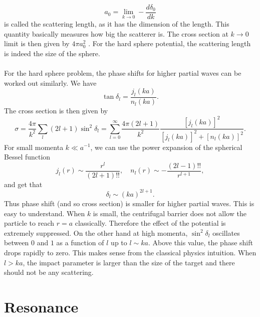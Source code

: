 \[a_0 = \lim_{k \to 0} -\frac{d\delta_0}{dk}\]
is called the scattering length, as it has the dimension of the length. This quantity basically measures how big the scatterer is. The cross section at $k \to 0$ limit is then given by $4\pi a_0^2$ . For the hard sphere potential, the scattering length is indeed the size of the sphere.
\\ \\
For the hard sphere problem, the phase shifts for higher partial waves can be worked out similarly. We have
\[\tan\delta_l = \frac{j_l(ka)}{n_l(ka)}.\]
The cross section is then given by
\[\sigma = \frac{4\pi}{k^2} \sum_l (2l+1) \sin^2\delta_l = \sum_{l=0}^{\infty} \frac{4\pi(2l+1)}{k^2} \frac{[j_l(ka)]^2}{[j_l(ka)]^2+[n_l(ka)]^2}.\]
For small momenta $k \ll a^{-1}$, we can use the power expansion of the spherical Bessel function
\[j_l(r) \sim \frac{r^{l}}{(2l+1)!!} , \quad n_l(r) \sim -\frac{(2l-1)!!}{r^{l+1}},\]
and get that
\[\delta_l \sim (ka)^{2l+1}.\]
Thus phase shift (and so cross section) is smaller for higher partial waves. This is easy to understand. When $k$ is small, the centrifugal barrier does not allow the particle to reach $r=a$ classically. Therefore the effect of the potential is extremely suppressed.
On the other hand at high momenta, $\sin^2\delta_l$ oscillates between $0$ and $1$ as a function of $l$ up to $l \sim ka$. Above this value, the phase shift drops rapidly to zero. This makes sense from the classical physics intuition. When $l > ka$,
the impact parameter is larger than the size of the target and there should not be any scattering.

\section{Resonance}
